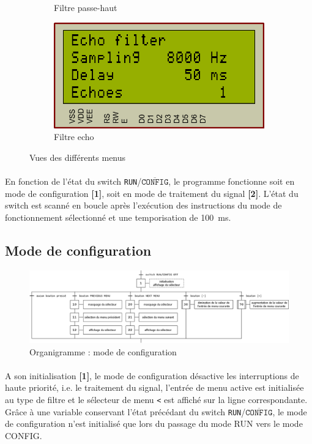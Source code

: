 \documentclass{article}
\begin{document}
\begin{figure}[H]
\begin{subfigure}[b]{0.34\textwidth}
            \caption{Filtre passe-haut}
        \end{subfigure}
        \begin{subfigure}[b]{0.34\textwidth}
            \centering
            \includegraphics[width=.9\textwidth]{./images/vue_echo.png}
            \caption{Filtre echo}
        \end{subfigure}
        \caption{Vues des différents menus}
   \end{figure}

    \paragraph{}
    En fonction de l'état du switch \texttt{RUN}/$\overline{\texttt{CONFIG}}$, le programme fonctionne soit en mode de configuration \textbf{[1]}, soit en mode de traitement du signal \textbf{[2]}. L'état du switch est scanné en boucle après l'exécution des instructions du mode de fonctionnement sélectionné et une temporisation de \SI{100}{\milli\second}.

    \subsection{Mode de configuration}
    \begin{figure}[H]
        \centering
        \includegraphics[width=\textwidth]{./images/orga_config.png}
        \caption{Organigramme : mode de configuration}
    \end{figure}

    \paragraph{}
    A son initialisation \textbf{[1]}, le mode de configuration désactive les interruptions de haute priorité, i.e. le traitement du signal, l'entrée de menu active est initialisée au type de filtre et le sélecteur de menu \texttt{<} est affiché sur la ligne correspondante. Grâce à une variable conservant l'état précédant du switch \texttt{RUN}/$\overline{\texttt{CONFIG}}$, le mode de configuration n'est initialisé que lors du passage du mode RUN vers le mode CONFIG.
\end{document}
